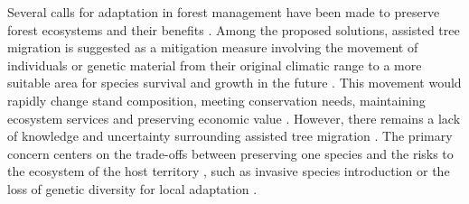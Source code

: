 Several calls for adaptation in forest management have been made to preserve forest ecosystems and their benefits \citep{Nagel2017Adaptivesilviculture,Messier2021sakeresilience}. 
Among the proposed solutions, assisted tree migration is suggested as a mitigation measure involving the movement of individuals or genetic material from their original climatic range to a more suitable area for species survival and growth in the future \citep{Vitt2010Assistedmigration,Dumroese2015Considerationsrestoring,Park2018Informationunderload,Park2023Provenancetrials}. 
This movement would rapidly change stand composition, meeting conservation needs, maintaining ecosystem services and preserving economic value \citep{Pedlar2011implementationassisted,Ste-Marie2011Assistedmigration,Winder2011Ecologicalimplications}. 
However, there remains a lack of knowledge and uncertainty surrounding assisted tree migration \citep{Klenk2015assistedmigration,Park2018Informationunderload}.
The primary concern centers on the trade-offs between preserving one species and the risks to the ecosystem of the host territory \citep{Ricciardi2009Assistedcolonization}, 
such as invasive species introduction or the loss of genetic diversity for local adaptation \citep{McLachlan2007frameworkdebate,Vitt2010Assistedmigration,Hewitt2011Takingstock,VanDaele2022Genomicanalyses}.

